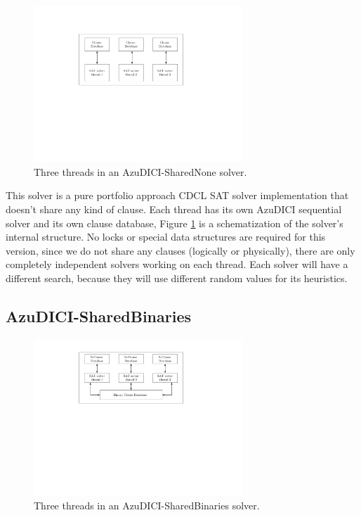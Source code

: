 \documentclass[12pt]{diicc}
\begin{document}
\begin{figure}[h!]
	\centering
		\includegraphics[width=0.7\textwidth]{sharednone}
	\caption{Three threads in an AzuDICI-SharedNone solver.}
	\label{fig:azu sharednone}
\end{figure}

This solver is a pure portfolio approach CDCL SAT solver implementation that doesn't share any kind of clause. Each thread has its own AzuDICI sequential solver and its own clause database, Figure \ref{fig:azu sharednone} is a schematization of the solver's internal structure. No locks or special data structures are required for this version, since we do not share any clauses (logically or physically), there are only completely independent solvers working on each thread. Each solver will have a different search, because they will use different random values for its heuristics.

\subsection{AzuDICI-SharedBinaries}

\begin{figure}[h!]
	\centering
		\includegraphics[width=0.7\textwidth]{sharedbinaries}
	\caption{Three threads in an AzuDICI-SharedBinaries solver.}
	\label{fig:azu sharedbinaries}
\end{figure}
\end{document}

